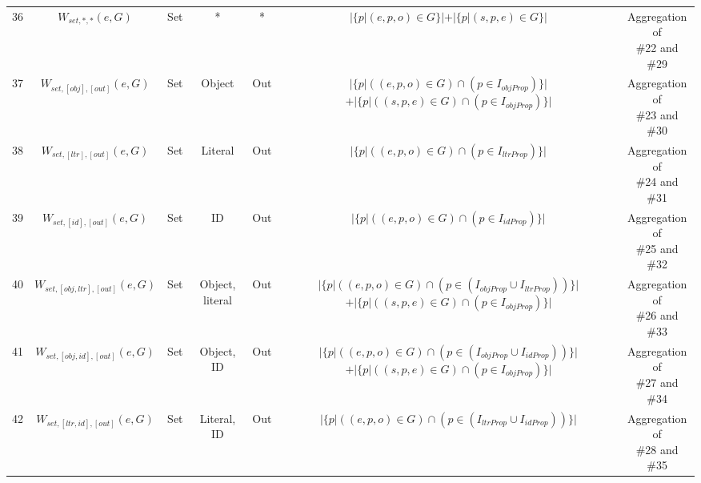 \begin{center}
{\begin{threeparttable}
\begin{tabular}{|c | c c c c c c |}
        36 & $W_{set,*,*}(e,G)$ & Set & * & * & $|\{p | (e, p, o) \in G\}| + |\{p | (s, p, e) \in G\}|$ & \CellWithForceBreak{Aggregation of \\ \#22 and \#29}\\
        37 & $W_{set,[obj],[out]}(e,G)$ & Set & Object & Out & \CellWithForceBreak{$|\{p | ((e, p, o) \in G) \cap (p \in I_{objProp})\}|$ \\ $+ |\{p | ((s, p, e) \in G) \cap (p \in I_{objProp})\}|$} & \CellWithForceBreak{Aggregation of \\ \#23 and \#30}\\
        38 & $W_{set,[ltr],[out]}(e,G)$ & Set & Literal & Out & $|\{p | ((e, p, o) \in G) \cap (p \in I_{ltrProp})\}|$ & \CellWithForceBreak{Aggregation of \\ \#24 and \#31}\\
        39 & $W_{set,[id],[out]}(e,G)$ & Set & ID & Out & $|\{p | ((e, p, o) \in G) \cap (p \in I_{idProp})\}|$ & \CellWithForceBreak{Aggregation of \\ \#25 and \#32}\\
        40 & $W_{set,[obj, ltr],[out]}(e,G)$ & Set & Object, literal & Out & \CellWithForceBreak{$|\{p | ((e, p, o) \in G) \cap (p \in (I_{objProp} \cup I_{ltrProp}))\}|$ \\ $+ |\{p | ((s, p, e) \in G) \cap (p \in I_{objProp})\}|$} & \CellWithForceBreak{Aggregation of \\ \#26 and \#33}\\
        41 & $W_{set,[obj, id],[out]}(e,G)$ & Set & Object, ID & Out & \CellWithForceBreak{$|\{p | ((e, p, o) \in G) \cap (p \in (I_{objProp} \cup I_{idProp}))\}|$ \\ $+ |\{p | ((s, p, e) \in G) \cap (p \in I_{objProp})\}|$} & \CellWithForceBreak{Aggregation of \\ \#27 and \#34}\\
        42 & $W_{set,[ltr, id],[out]}(e,G)$ & Set & Literal, ID & Out & $|\{p | ((e, p, o) \in G) \cap (p \in (I_{ltrProp} \cup I_{idProp}))\}|$ & \CellWithForceBreak{Aggregation of \\ \#28 and \#35}\\


\end{tabular}
\end{threeparttable}}
\end{center}
